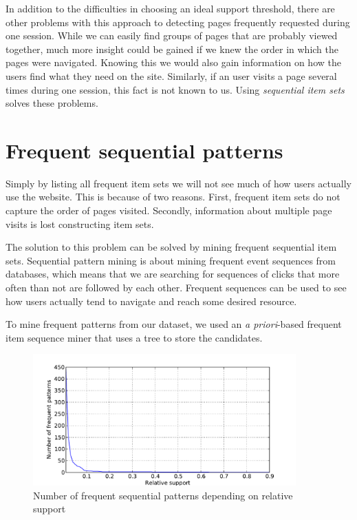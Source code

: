 \documentclass[english,a4paper]{article}
\begin{document}
In addition to the difficulties in choosing an ideal support threshold, there are other problems with this approach to detecting pages frequently requested during one session. While we can easily find groups of pages that are probably viewed together, much more insight could be gained if we knew the order in which the pages were navigated. Knowing this we would also gain information on how the users find what they need on the site. Similarly, if an user visits a page several times during one session, this fact is not known to us. Using \emph{sequential item sets} solves these problems.







\section{Frequent sequential patterns}
Simply by listing all frequent item sets we will not see much of how users actually use the website. This is because of two reasons. First, frequent item sets do not capture the order of pages visited. Secondly, information about multiple page visits is lost constructing item sets.

The solution to this problem can be solved by mining frequent sequential item sets. Sequential pattern mining is about mining frequent event sequences from databases, which means that we are searching for sequences of clicks that more often than not are followed by each other. Frequent sequences can be used to see how users actually tend to navigate and reach some desired resource.

To mine frequent patterns from our dataset, we used an \emph{a priori}-based frequent item sequence miner that uses a tree to store the candidates\cite{seq_apriori}.

\begin{figure}[H]
  \centering
      \includegraphics[width=0.9\textwidth]{sequential_itemset_count}
  \caption{Number of frequent sequential patterns depending on relative support}
\end{figure}
\end{document}
